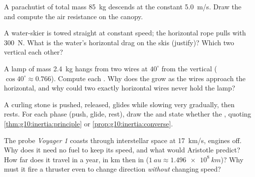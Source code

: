 \begin{exercise}[$\star\star$]\label{exo:g10:inertia:10}
A parachutist of total mass \qty{85}{kg} descends  at the
constant \qty{5.0}{m/s}. Draw the  and compute the air
resistance on the canopy.
\end{exercise}

\begin{exercise}[$\star\star$]\label{exo:g10:inertia:11}
A water-skier is towed straight at constant speed; the horizontal rope
pulls with \qty{300}{N}. What is the water's horizontal drag on the
skis (justify)? Which two vertical   each other?
\end{exercise}

\begin{exercise}[$\star\star\star$]\label{exo:g10:inertia:12}
A lamp of mass \qty{2.4}{kg} hangs from two wires at $40^\circ$ from
the vertical ($\cos 40^\circ \approx 0.766$). Compute each .
Why does the  grow as the wires approach the horizontal, and
why could two exactly horizontal wires never hold the lamp?
\end{exercise}

\begin{exercise}[$\star\star\star$]\label{exo:g10:inertia:13}
A curling stone is pushed, released, glides while slowing very
gradually, then rests. For each phase (push, glide, rest), draw the
 and state whether the  , quoting
\cref{thm:g10:inertia:principle} or \cref{prop:g10:inertia:converse}.
\end{exercise}

\begin{exercise}[$\star\star\star$]\label{exo:g10:inertia:14}
The probe \emph{Voyager 1} coasts through interstellar space at
\qty{17}{km/s}, engines off. Why does it need no fuel to keep its
speed, and what would Aristotle predict? How far does it travel in a
year, in \unit{km} then in  ($\qty{1}{au} \approx
\qty{1.496e8}{km}$)? Why must it fire a thruster even to change
direction \emph{without} changing speed?
\end{exercise}

